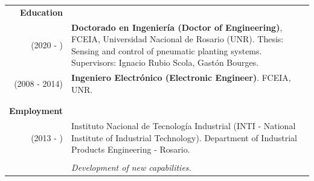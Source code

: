 \documentclass[a4paper,10pt, sans]{article}
\begin{document}
\begin{table}[H]
\begin{tabularx}{\textwidth}{r X}         
    \textbf{Education} & {} \\ [1ex]
       (2020 - ) & \textbf{Doctorado en Ingeniería (Doctor of Engineering)}, FCEIA, Universidad Nacional de Rosario (UNR). Thesis: Sensing and control of pneumatic planting systems. Supervisors: Ignacio Rubio Scola, Gastón Bourges.\\ [1ex]
       (2008 - 2014) & \textbf{Ingeniero Electrónico (Electronic Engineer)}. FCEIA, UNR.\\ \\ \hline \\
    \textbf{Employment} & {}\\ [1ex]
      (2013 - ) & Instituto Nacional de Tecnología Industrial (INTI - National Institute of Industrial Technology). Department of Industrial Products Engineering - Rosario.\\ \\
            
        {} & \hspace{2cm} \textit{Development of new capabilities.} \\ [1ex]
        

\end{tabularx}
\end{table}
\end{document}
